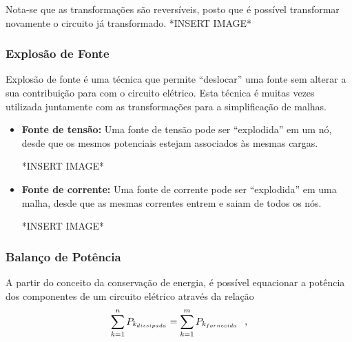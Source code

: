 \documentclass{article}
\numberwithin{equation}{section}
\begin{document}
    Nota-se que as transformações são reversíveis, posto que é possível transformar novamente o circuito já transformado.
    \newline
    *INSERT IMAGE*


    \subsubsection{Explosão de Fonte}
    \label{subsubsec:explosion}
    Explosão de fonte é uma técnica que permite ``deslocar'' uma fonte sem alterar a sua contribuição para com o circuito elétrico. Esta técnica é muitas vezes utilizada juntamente com as transformações para a simplificação de malhas.
    \begin{itemize}
        \item \textbf{Fonte de tensão:} Uma fonte de tensão pode ser ``explodida'' em um nó, desde que os mesmos potenciais estejam associados às mesmas cargas.

        *INSERT IMAGE*
        \item \textbf{Fonte de corrente:} Uma fonte de corrente pode ser ``explodida'' em uma malha, desde que as mesmas correntes entrem e saiam de todos os nós.  %

        *INSERT IMAGE*
    \end{itemize}

    \subsubsection{Balanço de Potência}
    \label{subsubsec:balancodepot}
    A partir do conceito da conservação de energia, é possível equacionar a potência dos componentes de um circuito elétrico através da relação
    \begin{equation}
        \sum_{k=1}^{n} \displaystyle{P_{k_{dissipada}}}=\displaystyle{\sum_{k=1}^{m} P_{k_{fornecida}}} \hspace{0.25cm} ,
    \end{equation}
\end{document}
